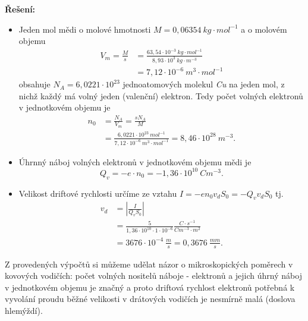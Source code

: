 \begin{example}
  \textbf{Řešení:}
  \begin{itemize}
    \item Jeden mol mědi o molové hmotnosti $M = 0,06354\ kg\cdot mol^{-1}$ a o molovém
          objemu 
          \begin{align*}
            V_m = \frac{M}{s} 
               &= \frac{63,54\cdot10^{-3}\ kg\cdot mol^{-1}}{8,93\cdot10^3\ kg\cdot m^{-3}} \\
               &= 7,12\cdot10^{-6}\ m^3\cdot mol^{-1}
          \end{align*}
          obsahuje $N_A = 6,0221\cdot10^{23}$ jednoatomových molekul \emph{Cu} na jeden mol,
          z nichž každý má volný jeden (valenční) elektron. Tedy počet volných elektronů v
          jednotkovém objemu je 
          \begin{align*}
            n_0 &= \frac{N_A}{V_m} = \frac{sN_A}{M}                                           \\
                &= \frac{6,0221\cdot10^{23}\ mol^{-1}}{7,12\cdot10^{-6}\ m^{3}\cdot mol^{-1}} 
                = 8,46\cdot10^{28}\ m^{-3}.
          \end{align*}  
    \item Úhrnný náboj volných elektronů v jednotkovém objemu mědi je $$Q_v = -e\cdot n_0 =
    -1,36\cdot10^{10}\ Cm^{-3}.$$
    \item Velikost driftové rychlosti určíme ze vztahu $I = -en_0v_dS_0 = - Q_v v_d S_0$ tj.
    \begin{align}
    v_d &= \left|\frac{I}{Q_v S_0}\right|                             \nonumber \\ 
    &= \frac{5}{1,36\cdot10^{10}\cdot1\cdot10^{-6}}\frac{C\cdot   
      s^{-1}}{Cm^{-3}\cdot m^2}                                  \nonumber \\
    &= 3676\cdot10^{-4}\ \frac{m}{s} = 0,3676\ \frac{mm}{s}.      \nonumber 
    \end{align}
  \end{itemize}
  Z provedených výpočtů si můžeme udělat názor o mikroskopických poměrech v kovových
  vodičích: počet volných nositelů náboje - elektronů a jejich úhrný náboj v jednotkovém
  objemu je značný a proto driftová rychlost elektronů potřebná k vyvolání proudu běžné
  velikosti v drátových vodičích je nesmírně malá (doslova hlemýždí).
\end{example}  
